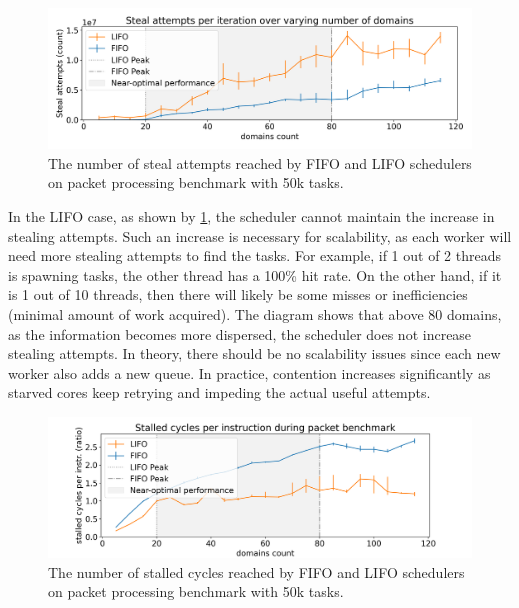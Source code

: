 \documentclass[12pt,a4paper,twoside]{report}
\begin{document}
\begin{figure} 
     \centering
     \includegraphics[width=1\textwidth]{eval/packet-basic-with-steal-counts2-bigger_font.png}
     \caption{The number of steal attempts reached by FIFO and LIFO schedulers on packet processing benchmark with 50k tasks.}
    \label{fig:packet-with-steal-counts}
\end{figure}

In the LIFO case, as shown by \ref{fig:packet-with-steal-counts}, the scheduler cannot maintain the increase in stealing attempts. Such an increase is necessary for scalability, as each worker will need more stealing attempts to find the tasks. For example, if 1 out of 2 threads is spawning tasks, the other thread has a 100\% hit rate. On the other hand, if it is 1 out of 10 threads, then there will likely be some misses or inefficiencies (minimal amount of work acquired). The diagram shows that above 80 domains, as the information becomes more dispersed, the scheduler does not increase stealing attempts. In theory, there should be no scalability issues since each new worker also adds a new queue. In practice, contention increases significantly as starved cores keep retrying and impeding the actual useful attempts. 

\begin{figure} 
     \centering 
     \includegraphics[width=1\textwidth]{eval/packet-basic-counters-bigger_font.png}
     \caption{The number of stalled cycles reached by FIFO and LIFO schedulers on packet processing benchmark with 50k tasks.}
    \label{fig:packet-counters}
\end{figure}
\end{document}
